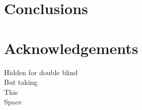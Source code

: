 \documentclass[runningheads,a4paper]{llncs}
\begin{document}


\section{Conclusions}

\section*{Acknowledgements}

Hidden for double blind\\
But taking\\
This\\
Space




\end{document}
